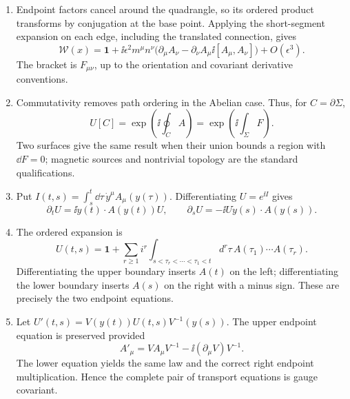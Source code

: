 \begin{enumerate}
  \begin{enumerate}
    \item[(a)] Endpoint factors cancel around the quadrangle, so its
      ordered product transforms by conjugation at the base point.  Applying
      the short-segment expansion on each edge, including the translated
      connection, gives
      \[
        \mathcal W(x)=\mathbf{1}+\ii\epsilon^2m^\mu n^\nu
        \bigl(\partial_\mu A_\nu-\partial_\nu A_\mu
              \ii[A_\mu,A_\nu]\bigr)+O(\epsilon^3).
      \]
      The bracket is \(F_{\mu\nu}\), up to the orientation and covariant
      derivative conventions.
    \item[(b)] Commutativity removes path ordering in the Abelian case.
      Thus, for \(C=\partial\Sigma\),
      \[
        U[C]=\exp\left(\ii\oint_C A\right)
          =\exp\left(\ii\int_\Sigma F\right).
      \]
      Two surfaces give the same result when their union bounds a region
      with \(\dd F=0\); magnetic sources and nontrivial topology are the
      standard qualifications.
    \item[(c)] Put
      \(I(t,s)=\int_s^t \dd\tau\,\dot y^\mu A_\mu(y(\tau))\).
      Differentiating \(U=e^{\ii I}\) gives
      \[
        \partial_tU=\ii\dot y(t)\cdot A(y(t))U,\qquad
        \partial_sU=-\ii U\dot y(s)\cdot A(y(s)).
      \]
    \item[(d)] The ordered expansion is
      \[
        U(t,s)=\mathbf{1}+\sum_{r\geq1}i^r
        \int_{s<\tau_r<\cdots<\tau_1<t}
        d^r\tau\,A(\tau_1)\cdots A(\tau_r).
      \]
      Differentiating the upper boundary inserts \(A(t)\) on the left;
      differentiating the lower boundary inserts \(A(s)\) on the right
      with a minus sign.  These are precisely the two endpoint equations.
    \item[(e)] Let
      \(U'(t,s)=V(y(t))U(t,s)V^{-1}(y(s))\).  The upper endpoint equation
      is preserved provided
      \[
        A'_\mu=VA_\mu V^{-1}-\ii(\partial_\mu V)V^{-1}.
      \]
      The lower equation yields the same law and the correct right endpoint
      multiplication.  Hence the complete pair of transport equations is
      gauge covariant.
  \end{enumerate}


\end{enumerate}
